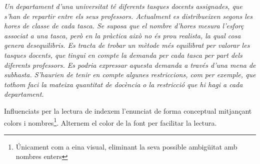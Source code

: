 \documentclass[10pt,twocolumn]{article}
\begin{document}
\begin{tcolorbox}[colback=black!1,title=\textbf{Enunciat del problema},coltitle=black,colbacktitle=black!10]
\textit{
Un departament d'una universitat té diferents tasques docents assignades, que s'han de repartir entre els seus professors. Actualment es distribueixen segons les hores de classe de cada tasca. Se suposa que el nombre d'hores mesura l'esforç associat a una tasca, però en la pràctica això no és prou realista, la qual cosa genera desequilibris. Es tracta de trobar un mètode més equilibrat per valorar les tasques docents, que tingui en compte la demanda per cada tasca per part dels diferents professors. Es podria expressar aquesta demanda a través d'una mena de subhasta. S'haurien de tenir en compte algunes restriccions, com per exemple, que tothom faci la mateixa quantitat de docència o la restricció que hi hagi a cada departament.
}
\end{tcolorbox}
Influenciats per la lectura de \cite{tah} indexem l'enunciat de forma conceptual mitjançant colors i nombres\footnote{Únicament com a eina visual, eliminant la seva possible ambigüitat amb nombres enters}. Alternem el color de la font per facilitar la lectura. 
\vspace{3mm}
\end{document}
